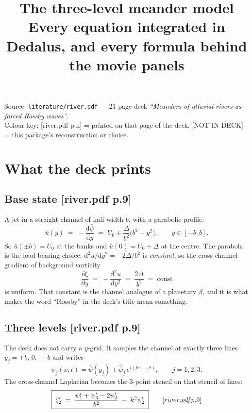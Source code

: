 \documentclass[11pt]{article}
\title{\bf The \code{river.pdf} three-level meander model\\
\large Every equation integrated in Dedalus, and every formula behind the movie panels}
\author{\code{numerical/deliverable1\_noboru\_model}}
\date{}
\newcommand{\code}[1]{\texttt{\small #1}}
\newcommand{\deck}[1]{{\color{blue!45!black}\small[river.pdf p.#1]}}
\newcommand{\notdeck}{{\color{red!55!black}\small[NOT IN DECK]}}
\newcommand{\zt}{\zeta_2'}
\newcommand{\pt}{\psi_2'}
\newcommand{\po}{\psi_1'}
\newcommand{\ph}{\psi_3'}
\begin{document}
\maketitle
\vspace{-9mm}

\begin{center}\small
Source: \code{literature/river.pdf} --- 21-page deck \emph{``Meanders of alluvial rivers as
forced Rossby waves''}.\\
Colour key: \deck{n} = printed on that page of the deck. \notdeck{} = this package's
reconstruction or choice.
\end{center}

\tableofcontents

\section{What the deck prints}

\subsection{Base state \deck{9}}
A jet in a straight channel of half-width $b$, with a parabolic profile:
\begin{equation}
  \bar u(y) \;=\; -\frac{\mathrm d\bar\psi}{\mathrm dy}
  \;=\; U_0+\frac{\Delta}{b^{2}}\bigl(b^{2}-y^{2}\bigr),
  \qquad y\in[-b,b].
\end{equation}
So $\bar u(\pm b)=U_0$ at the banks and $\bar u(0)=U_0+\Delta$ at the centre. The
parabola is the load-bearing choice: $\mathrm d^{2}\bar u/\mathrm dy^{2}=-2\Delta/b^{2}$
is \emph{constant}, so the cross-channel gradient of background vorticity
\begin{equation}
  \frac{\partial\bar\zeta}{\partial y} \;=\; -\frac{\mathrm d^{2}\bar u}{\mathrm dy^{2}}
  \;=\; \frac{2\Delta}{b^{2}} \;=\; \text{const}
\end{equation}
is uniform. That constant is the channel analogue of a planetary $\beta$, and it is what
makes the word ``Rossby'' in the deck's title mean something.

\subsection{Three levels \deck{9}}
The deck does not carry a $y$-grid. It samples the channel at exactly three lines
$y_j=+b,\,0,\,-b$ and writes
\begin{equation}
  \psi_j(x,t)=\bar\psi(y_j)+\hat\psi_j\,e^{i(kx-\omega t)},\qquad j=1,2,3 .
\end{equation}
The cross-channel Laplacian becomes the 3-point stencil on that stencil of lines:
\begin{equation}
  \boxed{\;\zt \;=\; \frac{\po+\ph-2\pt}{b^{2}} \;-\; k^{2}\pt\;}
  \qquad\deck{9}
  \label{eq:zeta}
\end{equation}
\end{document}
